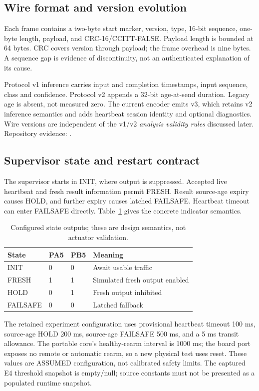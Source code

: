 \documentclass[a4paper,11pt]{article}
\newcommand{\src}[1]{{\small\color{muted}Repository evidence: \path{#1}.}}
\newcommand{\page}{\clearpage}
\begin{document}
\subsection{Wire format and version evolution}
Each frame contains a two-byte start marker, version, type, 16-bit sequence, one-byte length, payload, and CRC-16/CCITT-FALSE. Payload length is bounded at 64 bytes. CRC covers version through payload; the frame overhead is nine bytes. A sequence gap is evidence of discontinuity, not an authenticated explanation of its cause.

Protocol v1 inference carries input and completion timestamps, input sequence, class and confidence. Protocol v2 appends a 32-bit age-at-send duration. Legacy age is absent, not measured zero. The current encoder emits v3, which retains v2 inference semantics and adds heartbeat session identity and optional diagnostics. Wire versions are independent of the v1/v2 \emph{analysis validity rules} discussed later.
\src{protocol/PROTOCOL.md; linux/README.md}
\page
\subsection{Supervisor state and restart contract}
The supervisor starts in INIT, where output is suppressed. Accepted live heartbeat and fresh result information permit FRESH. Result source-age expiry causes HOLD, and further expiry causes latched FAILSAFE. Heartbeat timeout can enter FAILSAFE directly. Table~\ref{tab:state} gives the concrete indicator semantics.
\begin{table}[H]\centering
\caption{Configured state outputs; these are design semantics, not actuator validation.}\label{tab:state}
\begin{tabular}{llll}\toprule State & PA5 & PB5 & Meaning\\\midrule
INIT & 0 & 0 & Await usable traffic\\FRESH & 1 & 1 & Simulated fresh output enabled\\HOLD & 0 & 1 & Fresh output inhibited\\FAILSAFE & 0 & 0 & Latched fallback\\\bottomrule\end{tabular}
\end{table}
The retained experiment configuration uses provisional heartbeat timeout 100 ms, source-age HOLD 200 ms, source-age FAILSAFE 500 ms, and a 5 ms transit allowance. The portable core's healthy-rearm interval is 1000 ms; the board port exposes no remote or automatic rearm, so a new physical test uses reset. These values are ASSUMED configuration, not calibrated safety limits. The captured E4 threshold snapshot is empty/null; source constants must not be presented as a populated runtime snapshot.
\end{document}
